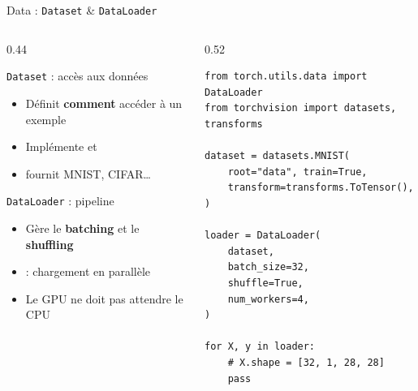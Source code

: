 \documentclass[aspectratio=169, 10pt]{beamer}
\begin{document}
\begin{frame}[fragile]{Data : \texttt{Dataset} \& \texttt{DataLoader}}
  \begin{columns}[T]
    \begin{column}{0.44\textwidth}
      \begin{block}{\texttt{Dataset} : accès aux données}
        \begin{itemize}
          \item Définit \textbf{comment} accéder à un exemple
          \item Implémente  et 
          \item {} fournit MNIST, CIFAR\ldots
        \end{itemize}
      \end{block}
      \smallskip
      \begin{block}{\texttt{DataLoader} : pipeline}
        \begin{itemize}
          \item Gère le \textbf{batching} et le \textbf{shuffling}
          \item {} : chargement en parallèle
          \item Le GPU ne doit pas attendre le CPU
        \end{itemize}
      \end{block}
    \end{column}
    \begin{column}{0.52\textwidth}
      \begin{lstlisting}[style=pythonstyle]
from torch.utils.data import DataLoader
from torchvision import datasets, transforms

dataset = datasets.MNIST(
    root="data", train=True,
    transform=transforms.ToTensor(),
)

loader = DataLoader(
    dataset,
    batch_size=32,
    shuffle=True,
    num_workers=4,
)

for X, y in loader:
    # X.shape = [32, 1, 28, 28]
    pass
      \end{lstlisting}
    \end{column}
  \end{columns}
\end{frame}
\end{document}
